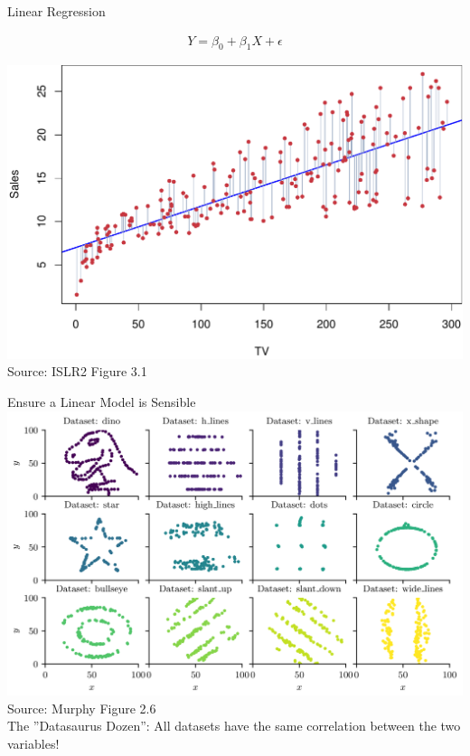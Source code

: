 \documentclass[ignorenonframetext,xcolor=x11names]{beamer}
\begin{document}
\begin{frame}{Linear Regression}

\begin{align*}
Y = \beta_0 + \beta_1 X + \epsilon
\end{align*}

\centering

\includegraphics[width=.8\textwidth]{../class11/Figures_Chapters_1-6/Chapter3/3_1.pdf} \\

\scriptsize Source: ISLR2 Figure 3.1
\end{frame}

\begin{frame}{Ensure a Linear Model is Sensible}
\centering
\includegraphics[width=.85\textwidth]{screen1.png} \\

\scriptsize Source: Murphy Figure 2.6 \\ \vspace{3mm}
\normalsize
The ''Datasaurus Dozen'': All datasets have the same correlation between the two variables!
\end{frame}
\end{document}
